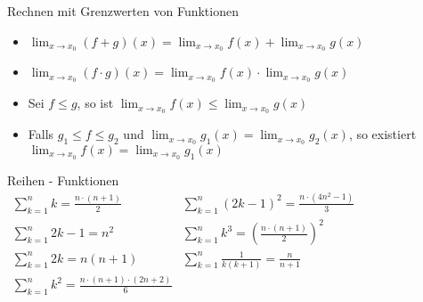 \begin{corollary}{Rechnen mit Grenzwerten von Funktionen}
    \begin{itemize}
        \item $\lim_{x \to x_0} (f + g)(x) = \lim_{x \to x_0} f(x) + \lim_{x \to x_0} g(x)$
        \item $\lim_{x \to x_0} (f \cdot g)(x) = \lim_{x \to x_0} f(x) \cdot \lim_{x \to x_0} g(x)$
        \item Sei $f \leq g$, so ist $\lim_{x \to x_0} f(x) \leq \lim_{x \to x_0} g(x)$
        \item Falls $g_1 \leq f \leq g_2$ und $\lim_{x \to x_0} g_1(x) = \lim_{x \to x_0} g_2(x)$, so existiert $\lim_{x \to x_0} f(x) = \lim_{x \to x_0} g_1(x)$
    \end{itemize}
\end{corollary}

\begin{definition}{Reihen - Funktionen}\\
        $
        \begin{array}{ll}
            \sum^{n}_{k=1} k = \frac{n \cdot (n+1)}{2} & \sum^{n}_{k=1} (2k - 1)^2 = \frac{n \cdot (4n^2-1)}{3}\\
            \sum^{n}_{k=1} 2k-1 = n^2 & \sum^{n}_{k=1} k^3 = \left( \frac{n \cdot (n+1)}{2}\right)^2\\
            \sum^{n}_{k=1} 2k = n(n+1) & \sum^{n}_{k=1} \frac{1}{k(k+1)} = \frac{n}{n+1}\\
            \sum^{n}_{k=1} k^2 = \frac{n \cdot (n+1) \cdot (2n+2)}{6} &
        \end{array}
        $
    \end{definition}



